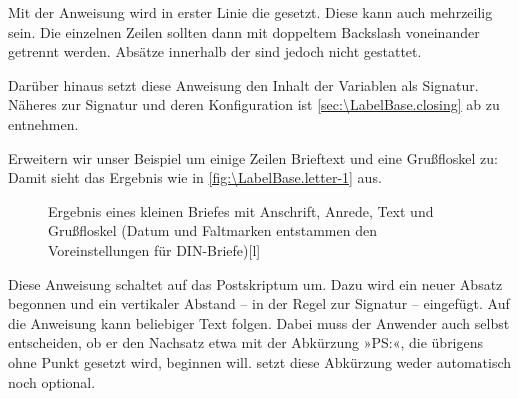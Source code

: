 \begin{Declaration}
\end{Declaration}
Mit der Anweisung  wird in erster Linie die
gesetzt. Diese kann auch mehrzeilig sein. Die einzelnen Zeilen sollten dann
mit doppeltem Backslash voneinander getrennt werden.  Absätze innerhalb der
 sind jedoch nicht gestattet.

Darüber hinaus setzt diese Anweisung %
\iffalse%
aber auch noch gleich %
\fi%
den Inhalt der Variablen  als
Signatur. Näheres zur Signatur und deren Konfiguration ist
\autoref{sec:\LabelBase.closing} ab
 zu entnehmen.

\begin{Example}
  Erweitern wir unser Beispiel um einige Zeilen Brieftext und eine Grußfloskel
  zu:
  Damit sieht das Ergebnis wie in \autoref{fig:\LabelBase.letter-1} aus.
  \begin{figure}
    \setcapindent{0pt}%
    \begin{captionbeside}{Ergebnis eines kleinen
        Briefes mit Anschrift, Anrede, Text und Grußfloskel (Datum und
        Faltmarken entstammen den Voreinstellungen für DIN-Briefe)}[l]
    \end{captionbeside}
    \label{fig:\LabelBase.letter-1}
  \end{figure}
\end{Example}
%
\EndIndexGroup
\ExampleEndFix%


\begin{Declaration}
\end{Declaration}%
Diese Anweisung schaltet auf das
Postskriptum um. Dazu wird ein neuer Absatz
begonnen und ein vertikaler Abstand -- in der Regel zur Signatur --
eingefügt. Auf die Anweisung  kann beliebiger Text folgen.
Dabei muss der Anwender auch selbst entscheiden, ob er den Nachsatz
etwa mit der Abkürzung »PS:«, die übrigens ohne Punkt gesetzt wird,
beginnen will. \KOMAScript{} setzt diese Abkürzung weder
automatisch noch optional.

